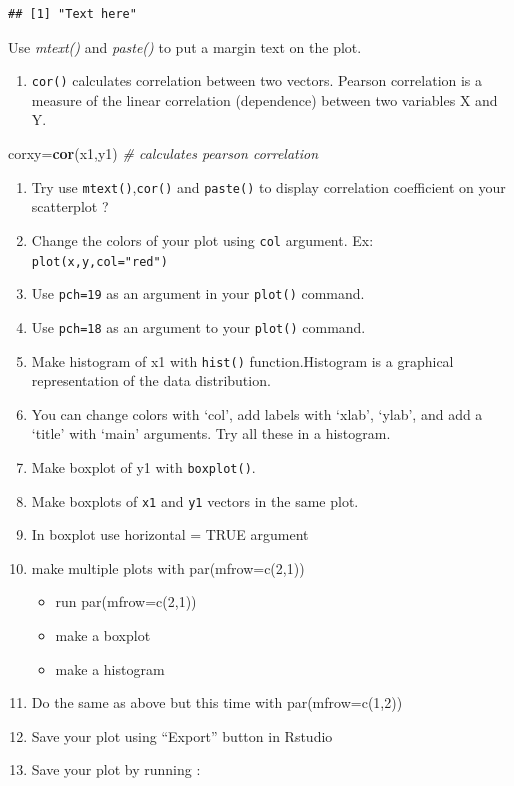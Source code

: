 \documentclass[12pt,]{krantz}
\newenvironment{Shaded}{\begin{snugshade}}{\end{snugshade}}
\newcommand{\CommentTok}[1]{\textcolor[rgb]{0.56,0.35,0.01}{\textit{#1}}}
\newcommand{\KeywordTok}[1]{\textcolor[rgb]{0.13,0.29,0.53}{\textbf{#1}}}
\newcommand{\NormalTok}[1]{#1}
\providecommand{\tightlist}{%
  \setlength{\itemsep}{0pt}\setlength{\parskip}{0pt}}
\begin{document}
\begin{verbatim}
## [1] "Text here"
\end{verbatim}

Use \emph{mtext()} and \emph{paste()} to put a margin text on the plot.

\begin{enumerate}
\def\labelenumi{\arabic{enumi}.}
\setcounter{enumi}{43}
\tightlist
\item
  \texttt{cor()} calculates correlation between two vectors.
  Pearson correlation is a measure of the linear correlation (dependence)
  between two variables X and Y.
\end{enumerate}

\begin{Shaded}
\begin{Highlighting}[]
\NormalTok{corxy=}\KeywordTok{cor}\NormalTok{(x1,y1) }\CommentTok{# calculates pearson correlation}
\end{Highlighting}
\end{Shaded}

\begin{enumerate}
\def\labelenumi{\arabic{enumi}.}
\setcounter{enumi}{43}
\item
  Try use \texttt{mtext()},\texttt{cor()} and \texttt{paste()} to display correlation coefficient on your scatterplot ?
\item
  Change the colors of your plot using \texttt{col} argument.
  Ex: \texttt{plot(x,y,col="red")}
\item
  Use \texttt{pch=19} as an argument in your \texttt{plot()} command.
\item
  Use \texttt{pch=18} as an argument to your \texttt{plot()} command.
\item
  Make histogram of x1 with \texttt{hist()} function.Histogram is a graphical representation of the data distribution.
\item
  You can change colors with `col', add labels with `xlab', `ylab', and add a `title' with `main' arguments. Try all these in a histogram.
\item
  Make boxplot of y1 with \texttt{boxplot()}.
\item
  Make boxplots of \texttt{x1} and \texttt{y1} vectors in the same plot.
\item
  In boxplot use horizontal = TRUE argument
\item
  make multiple plots with par(mfrow=c(2,1))

  \begin{itemize}
  \tightlist
  \item
    run par(mfrow=c(2,1))
  \item
    make a boxplot
  \item
    make a histogram
  \end{itemize}
\item
  Do the same as above but this time with par(mfrow=c(1,2))
\item
  Save your plot using ``Export'' button in Rstudio
\item
  Save your plot by running :
\end{enumerate}
\end{document}
